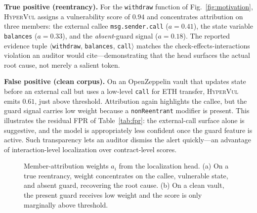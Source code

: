 \documentclass[conference]{IEEEtran}
\newcommand{\hypervul}{\textsc{HyperVul}}
\begin{document}
\noindent\textbf{True positive (reentrancy).} For the \texttt{withdraw} function of
Fig.~\ref{fig:motivation}, \hypervul{} assigns a vulnerability score of $0.94$ and
concentrates attribution on three members: the external callee \texttt{msg.sender.call}
($a{=}0.41$), the state variable \texttt{balances} ($a{=}0.33$), and the
\emph{absent}-guard signal ($a{=}0.18$). The reported evidence tuple
$\langle$\texttt{withdraw}, \texttt{balances}, \texttt{call}$\rangle$ matches the
check-effects-interactions violation an auditor would cite---demonstrating that the
head surfaces the actual root cause, not merely a salient token.

\noindent\textbf{False positive (clean corpus).} On an OpenZeppelin vault that updates
state before an external call but uses a low-level \texttt{call} for ETH transfer,
\hypervul{} emits $0.61$, just above threshold. Attribution again highlights the
callee, but the guard signal carries low weight because a \texttt{nonReentrant}
modifier is present. This illustrates the residual FPR of Table~\ref{tab:fpr}: the
external-call surface alone is suggestive, and the model is appropriately less
confident once the guard feature is active. Such transparency lets an auditor dismiss
the alert quickly---an advantage of interaction-level localization over
contract-level scores.

\begin{figure}[t]
\centering
{}
\caption{Member-attribution weights $a_i$ from the localization head. (a) On a true
reentrancy, weight concentrates on the callee, vulnerable state, and absent guard,
recovering the root cause. (b) On a clean vault, the present guard receives low weight
and the score is only marginally above threshold.}
\label{fig:loc}
\end{figure}
\end{document}
